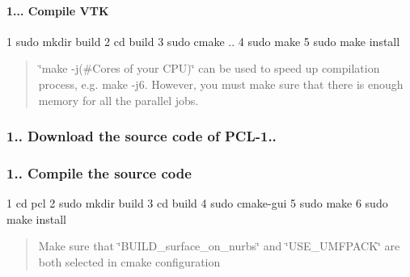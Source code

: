\paragraph*{1... Compile V\+TK}


\begin{DoxyCode}
1 sudo mkdir build
2 cd build
3 sudo cmake ..
4 sudo make
5 sudo make install
\end{DoxyCode}


\begin{quote}
\char`\"{}make -\/j(\#\+Cores of your C\+P\+U)\char`\"{} can be used to speed up compilation process, e.\+g. make -\/j6. However, you must make sure that there is enough memory for all the parallel jobs. \end{quote}




\subsubsection*{1.. Download the source code of P\+C\+L-\/1..}





\subsubsection*{1.. Compile the source code}


\begin{DoxyCode}
1 cd pcl
2 sudo mkdir build
3 cd build
4 sudo cmake-gui
5 sudo make
6 sudo make install
\end{DoxyCode}


\begin{quote}
Make sure that \char`\"{}\+B\+U\+I\+L\+D\+\_\+surface\+\_\+on\+\_\+nurbs\char`\"{} and \char`\"{}\+U\+S\+E\+\_\+\+U\+M\+F\+P\+A\+C\+K\char`\"{} are both selected in cmake configuration\end{quote}
